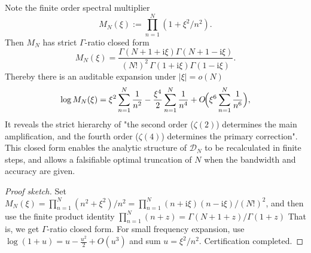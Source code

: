 \begin{conclusion}\label{con:xi-terminal-scale-kernel-gamma-closed-form}
Note the finite order spectral multiplier
\[
M_N(\xi):=\prod_{n=1}^{N}(1+\xi^2/n^2).
\]
Then \(M_N\) has strict \(\Gamma\)-ratio closed form
\[
\boxed{\;
M_N(\xi)=\frac{\Gamma(N+1+\mathrm{i}\xi)\Gamma(N+1-\mathrm{i}\xi)}{(N!)^2\,\Gamma(1+\mathrm{i}\xi)\Gamma(1-\mathrm{i}\xi)}.\;}
\]
Thereby there is an auditable expansion under \(|\xi|=o(N)\)
\[
\log M_N(\xi)=\xi^2\sum_{n=1}^{N}\frac{1}{n^2}-\frac{\xi^4}{2}\sum_{n=1}^{N}\frac{1}{n^4}+O\!\Bigl(\xi^6\sum_{n=1}^{N}\frac{1}{n^6}\Bigr),
\]
It reveals the strict hierarchy of "the second order (\(\zeta(2)\)) determines the main amplification, and the fourth order (\(\zeta(4)\)) determines the primary correction".
This closed form enables the analytic structure of \(\mathcal D_N\) to be recalculated in finite steps, and allows a falsifiable optimal truncation of \(N\) when the bandwidth and accuracy are given.
\end{conclusion}
\begin{proof}[Proof sketch]
Set \(M_N(\xi)=\prod_{n=1}^{N}(n^2+\xi^2)/n^2=\prod_{n=1}^{N}(n+\mathrm{i}\xi)(n-\mathrm{i}\xi)/(N!)^2\), and then use the finite product identity
\(
\prod_{n=1}^{N}(n+z)=\Gamma(N+1+z)/\Gamma(1+z)
\)
That is, we get \(\Gamma\)-ratio closed form.
For small frequency expansion, use \(\log(1+u)=u-\frac{u^2}{2}+O(u^3)\) and sum \(u=\xi^2/n^2\). Certification completed.
\end{proof}

